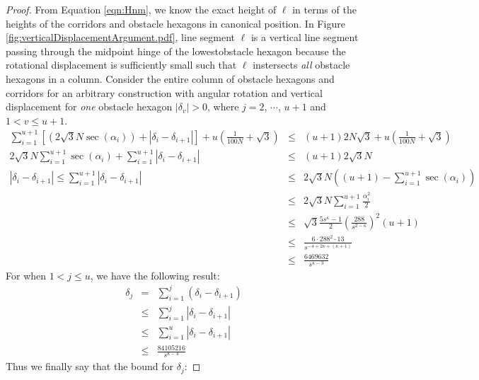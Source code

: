 \documentclass[10pt]{CSUNthesis}
\theoremstyle{plain}%
\theoremstyle{definition}
\theoremstyle{remark}
\newcommand{\lr}[1]{\left( #1 \right)}
\newcommand{\vlr}[1]{\left\vert #1 \right\vert}
\begin{document}
\begin{proof}
From Equation \ref{eqn:Hnm}, we know the exact height of $\ell$ in terms of the heights of the corridors and obstacle hexagons in canonical position.
In Figure \ref{fig:verticalDisplacementArgument.pdf}, line segment $\ell$ is a vertical line segment passing through  the midpoint hinge of the lowestobstacle hexagon  because the rotational displacement is sufficiently small such that $\ell$ instersects \textit{all} obstacle hexagons in a column.  
Consider the entire column of obstacle hexagons and corridors for an arbitrary construction with angular rotation and vertical displacement for \textit{one} obstacle hexagon $\vert \delta_v \vert > 0$, where $j=2$, $\cdots$, $u+1$ and $1 < v \leq u+1$.
\begin{eqnarray*}
\sum_{i=1}^{u+1} \left[ \lr{2 \sqrt{3} N \sec \lr{ \alpha_i}} + \vlr{\delta_i - \delta_{i+1}} \right] + u \lr{\frac{1}{100N}+\sqrt{3}} &\leq& (u+1) 2 N \sqrt{3} + u  \lr{\frac{1}{100N}+\sqrt{3}}\\
2 \sqrt{3} N \sum_{i=1}^{u+1} \sec \lr{ \alpha_i} + \sum_{i=1}^{u+1} \vlr{\delta_i - \delta_{i+1}} &\leq& (u+1) 2 \sqrt{3} N \\
\vlr{\delta_i - \delta_{i+1}}\leq \sum_{i=1}^{u+1}\vlr{\delta_i - \delta_{i+1}} &\leq&  2 \sqrt{3} N \lr{(u+1) - \sum_{i=1}^{u+1} \sec \lr{ \alpha_i}}\\
&\leq& 2 \sqrt{3} N \sum_{i=1}^{u+1} \frac{\alpha_i^2}{2}\\
&\leq&  \sqrt{3} \frac{5s^\kappa - 1}{2} \lr{\frac{288}{s^{2-\kappa}}}^2 (u+1)\\ 
&\leq& \frac{6 \cdot 288^2 \cdot 13}{s^{-4+2\kappa + \lr{\kappa + 1}}}\\
&\leq&\frac{6469632}{s^{\kappa-3}}
\end{eqnarray*}
For when $1< j\leq u$, we have the following result:
\begin{eqnarray*}
\delta_j &=& \sum_{i=1}^{j} \lr{\delta_i - \delta_{i+1}}\\
&\leq&\sum_{i=1}^{j} \vlr{\delta_i - \delta_{i+1}}\\
&\leq& \sum_{i=1}^{u} \vlr{\delta_i - \delta_{i+1}}\\
&\leq&  \frac{84105216}{s^{\kappa-4}}
\end{eqnarray*}
Thus we finally say that the bound for $\delta_j$:


\end{proof}
\end{document}

